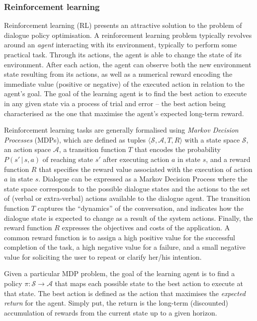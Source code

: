 \subsubsection*{Reinforcement learning}

Reinforcement learning (RL) presents an attractive solution to the problem of dialogue policy optimisation.  A reinforcement learning problem typically revolves around an \textit{agent} interacting with its environment, typically to perform some practical task.  Through its actions, the agent is able to change the state of its environment.  After each action, the agent can observe both the new environment state resulting from its actions, as well as a numerical reward encoding the immediate value (positive or negative) of the executed action in relation to the agent's goal. The goal of the learning agent is to find the best action to execute in any given state via a process of trial and error  -- the best action being characterised as the one that maximise the agent's expected long-term reward.  

Reinforcement learning tasks are generally formalised using \textit{Markov Decision Processes} (MDPs), which are defined as tuples $\langle \mathcal{S}, \mathcal{A}, T, R \rangle$ with a state space $\mathcal{S}$, an action space $\mathcal{A}$, a transition function $T$ that encodes  the probability $P(s'\, | \, s,a)$ of reaching state $s'$ after executing action $a$ in state $s$, and a reward function $R$ that specifies the reward value associated with the execution of action $a$ in state $s$. Dialogue can be expressed as a Markov Decision Process where the state space corresponds to the possible dialogue states and the actions to the set of (verbal or extra-verbal) actions available to the dialogue agent.  The transition function $T$ captures the ``dynamics'' of the conversation, and indicates how the dialogue state is expected to change as a result of the system actions. Finally, the reward function $R$ expresses the objectives and costs of the application. A common reward function is to assign a high positive value for the successful completion of the task, a high negative value for a failure, and a small negative value for soliciting the user to repeat or clarify her/his intention.  

Given a particular MDP problem, the goal of the learning agent is to find a policy $\pi: \mathcal{S} \rightarrow \mathcal{A}$ that maps each possible state to the best action to execute at that state.  The best action is defined as the action that maximises the \textit{expected return} for the agent.  Simply put, the return is the long-term (discounted) accumulation of rewards from the current state up to a given horizon. 

